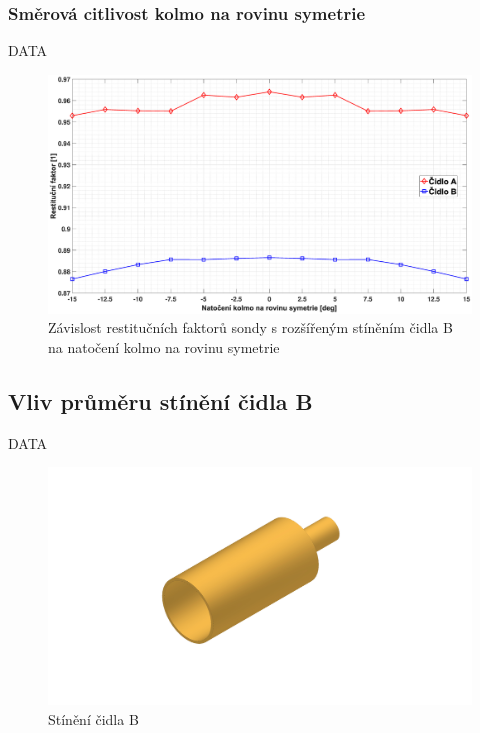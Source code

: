         \subsubsection{Směrová citlivost kolmo na rovinu symetrie}
            DATA
            
             \begin{figure}[ht!]
                \centering
                \includegraphics*[width=\textwidth, trim={5.9cm 1.0cm 5.8cm 2.0cm}]{400_SIMULACE_KONSTRUKCNICH_UPRAV/Grafy/03_kolma_rovina}
                \caption{Závislost restitučních faktorů sondy s rozšířeným stíněním čidla B na natočení kolmo na rovinu symetrie}
                \label{fig:sonda-s-rosirenym-stinenim-kolma-rovina}
            \end{figure}
        
    \newpage
    \subsection{Vliv průměru stínění čidla B}
        DATA
        
        \begin{figure}[ht!]
            \centering
            \includegraphics[width=\textwidth]{400_SIMULACE_KONSTRUKCNICH_UPRAV/Vykresy_rendery/Stineni_B.png}
            \caption{Stínění čidla B}
            \label{fig:stineni-B}
        \end{figure}
        
